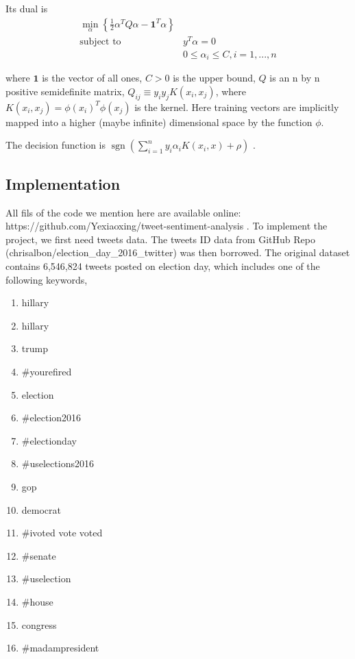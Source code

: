 \documentclass[12pt,a4paper]{report}
\begin{document}
        Its dual is
        $$
          \begin{aligned}
            \min_{\alpha} \left\{ \frac{1}{2} \alpha^T Q \alpha - \mathbf{1}^T \alpha \right\} \\
            \textrm {subject to } & y^T \alpha = 0                                             \\
                                  & 0 \leq \alpha_i \leq C, i=1, ..., n
          \end{aligned}
        $$

        where $\mathbf{1}$ is the vector of all ones, $C > 0$ is the upper bound, $Q$ is an n by n positive semidefinite matrix, $Q_{ij} \equiv y_i y_j K(x_i, x_j)$, where $K(x_i, x_j) = \phi (x_i)^T \phi (x_j)$ is the kernel. Here training vectors are implicitly mapped into a higher (maybe infinite) dimensional space by the function $\phi$.

        The decision function is $\operatorname{sgn}(\sum_{i=1}^n y_i \alpha_i K(x_i, x) + \rho)$ \cite{scikit-learn}.

    \subsection{Implementation}
      All fils of the code we mention here are available online: https://github.com/Yexiaoxing/tweet-sentiment-analysis .
      To implement the project, we first need tweets data. The tweets ID data from GitHub Repo (chrisalbon/election\_day\_2016\_twitter) was then borrowed. The original dataset contains 6,546,824 tweets posted on election day, which includes one of the following keywords,

      \begin{enumerate}
        \item hillary
        \item hillary
        \item trump
        \item \#yourefired
        \item election
        \item \#election2016
        \item \#electionday
        \item \#uselections2016
        \item gop
        \item democrat
        \item \#ivoted vote voted
        \item \#senate
        \item \#uselection
        \item \#house
        \item congress
        \item \#madampresident
      \end{enumerate}
\end{document}
